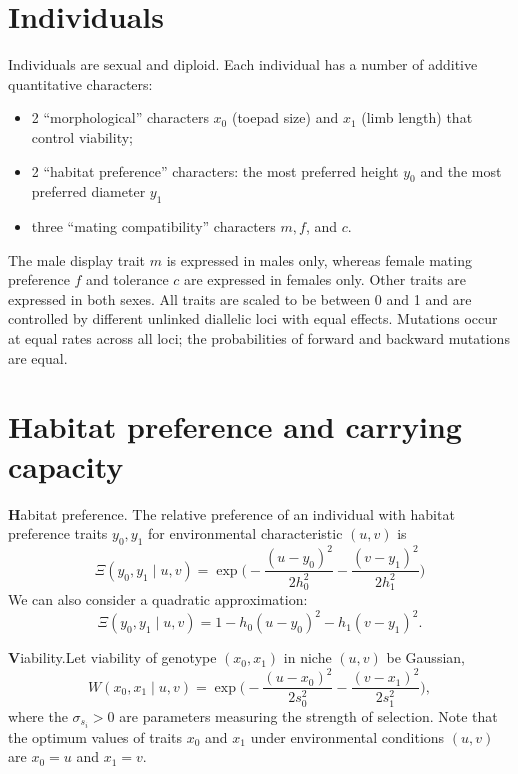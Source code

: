 \documentclass{article}
\begin{document}
\section{Individuals}

Individuals are sexual and diploid. Each individual has a number of additive quantitative characters:
\begin{itemize}
  \item 2 ``morphological'' characters $x_0$ (toepad size) and $x_1$
    (limb length) that control viability;
  \item 2 ``habitat preference'' characters: the most preferred height
    $y_0$ and the most preferred diameter $y_1$
  \item three ``mating compatibility'' characters $m, f$, and $c$.
\end{itemize}

The male display trait $m$ is expressed in males only, whereas female mating preference $f$ and tolerance $c$ are expressed in females only.
Other traits are expressed in both sexes.
All traits are scaled to be between 0 and 1 and are controlled by different unlinked diallelic loci with equal effects.
Mutations occur at equal rates across all loci;
the probabilities of forward and backward mutations are equal.


\newpage
\section{Habitat preference and carrying capacity}

{\textbf Habitat preference}.\quad
The relative preference of an individual with habitat preference traits $y_0,y_1$ for environmental characteristic $(u,v)$ is
\begin{equation}
  \Xi(y_0,y_1\mid u,v) = \exp\big(-\frac{(u-y_0)^2}{2h_0^2} -\frac{(v-y_1)^2}{2h_1^2}\big)
\end{equation}
We can also consider a quadratic approximation:
\begin{equation} \label{quad}
  \Xi(y_0,y_1\mid u,v) = 1-h_0(u-y_0)^2-h_1(v-y_1)^2.
\end{equation}

{\textbf Viability}.\quad Let viability of genotype $(x_0,x_1)$ in niche $(u,v)$ be Gaussian,
\begin{equation}
  W(x_0,x_1 \mid u,v) = \exp\big(-\frac{(u-x_0)^2}{2s_0^2} -\frac{(v-x_1)^2}{2s_1^2}\big),
\end{equation}
where the $\sigma_{s_i}>0$ are parameters measuring the strength of selection.
Note that the optimum values of traits $x_0$ and $x_1$ under environmental conditions $(u,v)$ are $x_0 = u$ and $x_1 = v$.\\
\end{document}
